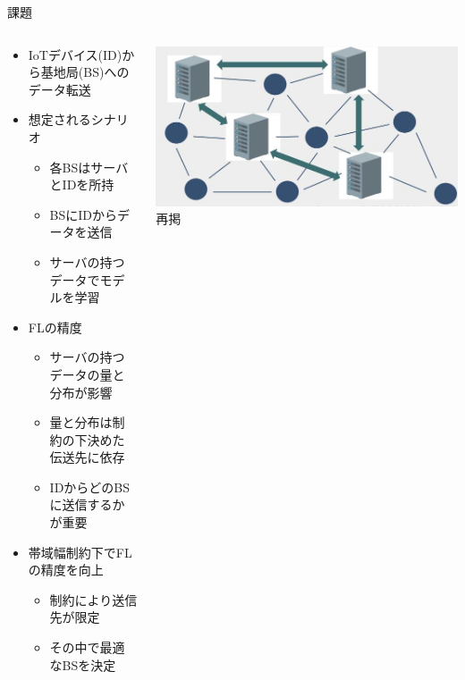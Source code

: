 \documentclass[unicode,12pt,aspectratio=169, dvipdfmx]{beamer}
\begin{document}
    \begin{frame}{課題}
        \begin{columns}
            \begin{column}[T]{.7\linewidth}
                \begin{itemize}
                    \item IoTデバイス(ID)から基地局(BS)へのデータ転送
                    \item 想定されるシナリオ
                    \begin{itemize}
                        \item 各BSはサーバとIDを所持
                        \item BSにIDからデータを送信
                        \item サーバの持つデータでモデルを学習
                    \end{itemize}
                    \item FLの精度
                    \begin{itemize}
                        \item サーバの持つデータの量と分布が影響
                        \item 量と分布は制約の下決めた伝送先に依存
                        \item IDからどのBSに送信するかが重要
                    \end{itemize}
                    \item 帯域幅制約下でFLの精度を向上
                        \begin{itemize}
                            \item 制約により送信先が限定
                            \item その中で最適なBSを決定
                        \end{itemize}
                \end{itemize}
            \end{column}
            \begin{column}[T]{.5\linewidth}
                \begin{center}
                    \includegraphics[scale=0.3]{figures/fl.png}
                    \scriptsize{再掲}
                \end{center}
        \end{column}
        \end{columns}
    \end{frame}
\end{document}
